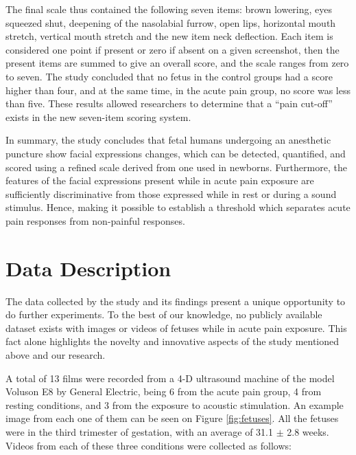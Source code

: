 The final scale thus contained the following seven items: brown lowering, eyes squeezed shut, deepening of the nasolabial furrow, open lips, horizontal mouth stretch, vertical mouth stretch and the new item neck deflection. Each item is considered one point if present or zero if absent on a given screenshot, then the present items are summed to give an overall score, and the scale ranges from zero to seven. The study concluded that no fetus in the control groups had a score higher than four, and at the same time, in the acute pain group, no score was less than five. These results allowed researchers to determine that a ``pain cut-off'' exists in the new seven-item scoring system.

In summary, the study concludes that fetal humans undergoing an anesthetic puncture show facial expressions changes, which can be detected, quantified, and scored using a refined scale derived from one used in newborns. Furthermore, the features of the facial expressions present while in acute pain exposure are sufficiently discriminative from those expressed while in rest or during a sound stimulus. Hence, making it possible to establish a threshold which separates acute pain responses from non-painful responses.

\section{Data Description}

The data collected by the study and its findings present a unique opportunity to do further experiments. To the best of our knowledge, no publicly available dataset exists with images or videos of fetuses while in acute pain exposure. This fact alone highlights the novelty and innovative aspects of the study mentioned above and our research.

A total of 13 films were recorded from a 4-D ultrasound machine of the model Voluson E8 by General Electric, being 6 from the acute pain group, 4 from resting conditions, and 3 from the exposure to acoustic stimulation. An example image from each one of them can be seen on Figure \ref{fig:fetuses}. All the fetuses were in the third trimester of gestation, with an average of 31.1 $\pm$ 2.8 weeks.  Videos from each of these three conditions were collected as follows:

